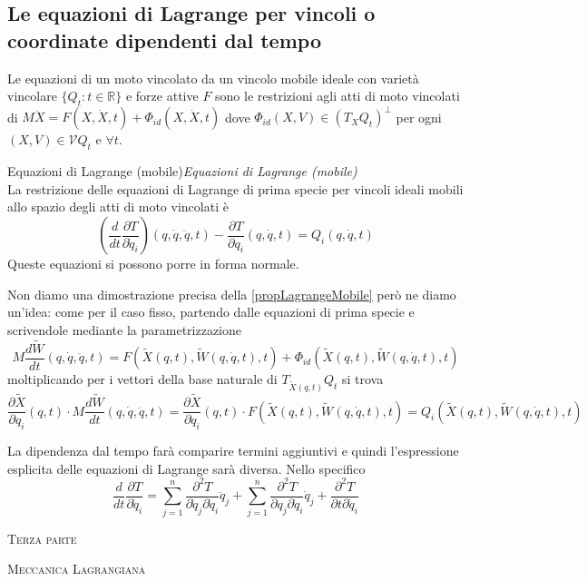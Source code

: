 \documentclass[11pt,a4paper,twoside]{book}
\newenvironment{proposizione}[1][\empty]{\begin{Proposizione}{
\ifx\empty#1\relax\else\mdseries\itshape#1\\\fi
}{}}{\end{Proposizione}}
\theoremstyle{esss}
\theoremstyle{dotless}
\numberwithin{equation}{section} %
\begin{document}
\subsection{Le equazioni di Lagrange per vincoli o coordinate dipendenti dal tempo}

Le equazioni di un moto vincolato da un vincolo mobile ideale con varietà vincolare $\{Q_t:t\in\mathbb{R}\}$ e forze attive $F$ sono le restrizioni agli atti di moto vincolati di $M\ddot{X}=F(X,\dot{X},t)+\Phi_{id}(X,\dot{X},t)$ dove $\Phi_{id}(X,V)\in (T_XQ_t)^\perp$ per ogni $(X,V)\in \mathcal{V}Q_t$ e $\forall t$.

\begin{proposizione}[Equazioni di Lagrange (mobile)]\label{propLagrangeMobile}
La restrizione delle equazioni di Lagrange di prima specie per vincoli ideali mobili allo spazio degli atti di moto vincolati è
\begin{equation}\label{eqLagrangeMobileo}
\left(\dfrac{d}{dt}\dfrac{\partial T}{\partial \dot{q}_i} \right) (q,\dot{q},\ddot{q},t) - \dfrac{\partial T}{\partial q_i}(q,\dot{q},t)=Q_i(q,\dot{q},t)
\end{equation}
Queste equazioni si possono porre in forma normale.
\end{proposizione}
Non diamo una dimostrazione precisa della \ref{propLagrangeMobile} però ne diamo un'idea: come per il caso fisso, partendo dalle equazioni di prima specie e scrivendole mediante la parametrizzazione
\[
M\dfrac{d\tilde{W}}{dt}(q,\dot{q},\ddot{q},t)=F\left(\tilde{X}(q,t),\tilde{W}(q,\dot{q},t),t\right)+\Phi_{id}\left(\tilde{X}(q,t),\tilde{W}(q,\dot{q},t),t\right)
\]
moltiplicando per i vettori della base naturale di $T_{\tilde{X}(q,t)}Q_t$ si trova
\[
\dfrac{\partial \tilde{X}}{\partial q_i}(q,t)\cdot M\dfrac{d\tilde{W}}{dt}(q,\dot{q},\ddot{q},t)=\dfrac{\partial \tilde{X}}{\partial q_i}(q,t)\cdot F\left(\tilde{X}(q,t),\tilde{W}(q,\dot{q},t),t\right)= Q_i\left(\tilde{X}(q,t),\tilde{W}(q,\dot{q},t),t\right)
\]

La dipendenza dal tempo farà comparire termini aggiuntivi e quindi l'espressione esplicita delle equazioni di Lagrange sarà diversa. Nello specifico
\[
\dfrac{d}{dt}\dfrac{\partial T}{\partial \dot{q}_i }= \sum_{j=1}^n \dfrac{\partial^2 T}{\partial \dot{q}_j \partial \dot{q}_i} \ddot{q}_j + 
\sum_{j=1}^n \dfrac{\partial^2 T}{\partial q_j \partial \dot{q}_i} \dot{q}_j +
\dfrac{\partial^2 T}{\partial t \partial \dot{q}_i} 
\]


\cleardoublepage
{}
\thispagestyle{plain}
	\begin{center}
		\vspace{.1\textheight}
		{\LARGE\scshape \textsc{Terza parte}\par}
		\vspace{.1\textheight}
		\textsc{}\par
		\vspace{.05\textheight}
		{\Huge \textsc{Meccanica Lagrangiana}\par}
		\vfill

\end{center}
\end{document}
